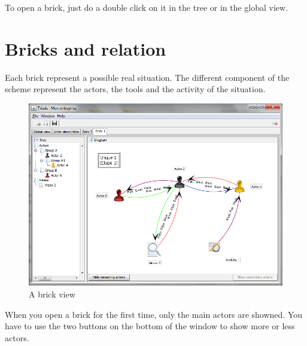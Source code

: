 To open a brick, just do a double click on it in the tree or in the global view.\\

\section{Bricks and relation}
Each brick represent a possible real situation. The different component of the scheme represent the actors, the tools and the activity of the situation.\\

\begin{figure}[h!]
\centering
\includegraphics[scale=0.55]{images/brique.png}
\caption{A brick view}

\label{brique}
\end{figure}
When you open a brick for the first time, only the main actors are showned. You have to use the two buttons on the bottom of the window to show more or less actors.\\

